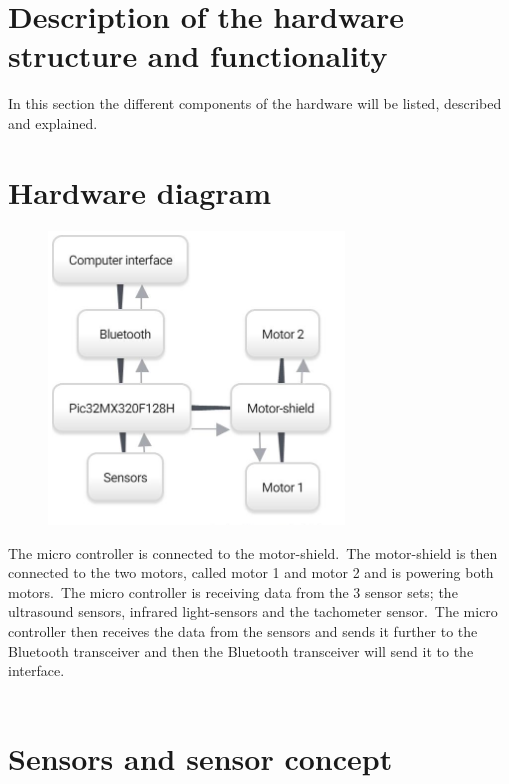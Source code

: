 \section{Description of the hardware structure and functionality}

In this section the different components of the hardware will be listed, described and explained.\


\section{Hardware diagram}
\begin{figure}[!ht]
	\centering
	\includegraphics[width=0.7\textwidth]{figures/hardwareDIA.jpg}
	\caption{}
	\label{Hardware diagram}
\end{figure}



The micro controller is connected to the motor-shield.\ The motor-shield is then connected to the two motors, called motor 1 and motor 2 and is powering both motors.\ The micro controller is receiving data from the 3 sensor sets; the ultrasound sensors, infrared light-sensors and the tachometer sensor.\ The micro controller then receives the data from the sensors and sends it further to the Bluetooth transceiver and then the Bluetooth transceiver will send it to the interface. \\ \\

\section{Sensors and sensor concept}

